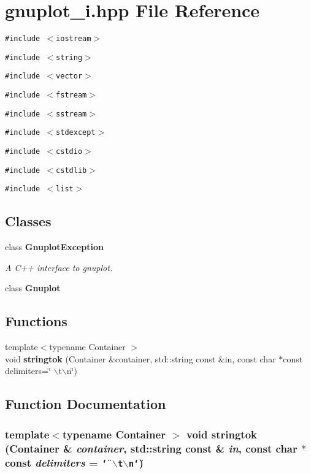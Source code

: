 \section{gnuplot\_\-i.hpp File Reference}
\label{d1/dd8/gnuplot__i_8hpp}
{\tt \#include $<$iostream$>$}\par
{\tt \#include $<$string$>$}\par
{\tt \#include $<$vector$>$}\par
{\tt \#include $<$fstream$>$}\par
{\tt \#include $<$sstream$>$}\par
{\tt \#include $<$stdexcept$>$}\par
{\tt \#include $<$cstdio$>$}\par
{\tt \#include $<$cstdlib$>$}\par
{\tt \#include $<$list$>$}\par
\subsection*{Classes}
\begin{CompactItemize}
\item 
class {\bf GnuplotException}
\begin{CompactList}\small\item\em A C++ interface to gnuplot. \item\end{CompactList}\item 
class {\bf Gnuplot}
\end{CompactItemize}
\subsection*{Functions}
\begin{CompactItemize}
\item 
{\footnotesize template$<$typename Container $>$ }\\void {\bf stringtok} (Container \&container, std::string const \&in, const char $\ast$const delimiters=\char`\"{} $\backslash$t$\backslash$n\char`\"{})
\end{CompactItemize}


\subsection{Function Documentation}
\subsubsection[{stringtok}]{\setlength{\rightskip}{0pt plus 5cm}template$<$typename Container $>$ void stringtok (Container \& {\em container}, \/  std::string const \& {\em in}, \/  const char $\ast$const  {\em delimiters} = {\tt \char`\"{}~$\backslash$t$\backslash$n\char`\"{}})\hspace{0.3cm}{\tt  [inline]}}\label{d1/dd8/gnuplot__i_8hpp_8dce6465408cd481ab4a9a7bf50bb6b4}




